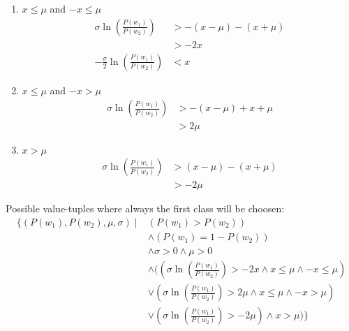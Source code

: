 \begin{enumerate}
	\item $x \le \mu$ and $-x \le \mu$ \\
		\begin{align*}
			\sigma\ln\left(\frac{P(w_1)}{P(w_2)}\right) &> -(x - \mu) - (x + \mu ) \\
			&> -2x \\
			- \frac{\sigma}{2}\ln\left(\frac{P(w_1)}{P(w_2)}\right) &< x
		\end{align*}	
		
	\item $x \le \mu$ and $-x > \mu$ \\
		\begin{align*}
			\sigma\ln\left(\frac{P(w_1)}{P(w_2)}\right) &> -(x - \mu) + x + \mu \\
			&> 2\mu
		\end{align*}
	\item $x > \mu$ \\
		\begin{align*}
			\sigma\ln\left(\frac{P(w_1)}{P(w_2)}\right) &> (x - \mu) - (x + \mu ) \\
			&> -2\mu
		\end{align*}
\end{enumerate}
Possible value-tuples where always the first class will be choosen:
\begin{align*}
\{ (P(w_1), P(w_2), \mu, \sigma) \mid &(P(w_1) > P(w_2)) \\
&\land (P(w_1) = 1-P(w_2)) \\
&\land \sigma>0 \land \mu>0 \\ 
&\land ((\sigma\ln\left(\frac{P(w_1)}{P(w_2)}\right)>-2x \land x \le \mu \land -x \le \mu) \\
&\lor (\sigma\ln\left(\frac{P(w_1)}{P(w_2)}\right)> 2\mu \land x \le \mu \land -x > \mu) \\
&\lor(\sigma\ln\left(\frac{P(w_1)}{P(w_2)}\right)> -2\mu) \land x > \mu)\}
\end{align*}

